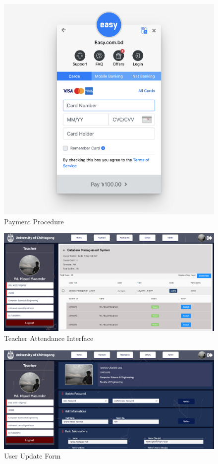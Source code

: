 \begin{figure}[H]
	\includegraphics[width=1\textwidth]{images/sslcommerz-card-entry}
	\caption{Payment Procedure}
\end{figure}
\begin{figure}[H]
	\includegraphics[width=1\textwidth]{images/teacher_att}
	\caption{Teacher Attendance Interface}
\end{figure}
\begin{figure}[H]
	\includegraphics[width=1\textwidth]{images/updateUser}
	\caption{User Update Form}
\end{figure}

